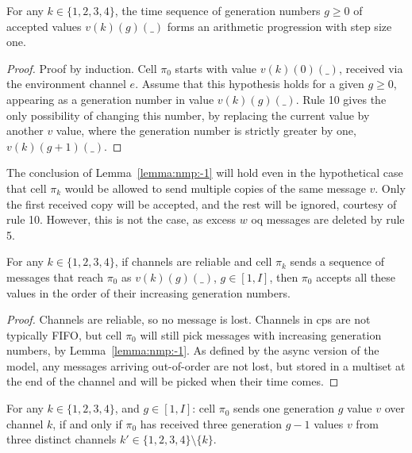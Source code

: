 \begin{lemma}\label{lemma:nmp:-1}
    For any $k \in \{ 1, 2, 3, 4 \}$, the time sequence of generation numbers $g \geq 0$ of accepted values $v(k)(g)(\_)$ forms an arithmetic progression with step size one.
\end{lemma}

\begin{proof}
    Proof by induction. Cell $\pi_0$ starts with value $v(k)(0)(\_)$, received via the environment channel $e$.
    Assume that this hypothesis holds for a given $g \geq 0$, appearing as a generation number in value $v(k)(g)(\_)$. Rule 10 gives the only possibility of changing this number, by replacing the current value by another $v$ value, where the generation number is strictly greater by one, 
    $v(k)(g+1)(\_)$. %
\end{proof}


\begin{remark}\label{remark:nmp:-1}
The conclusion of Lemma~\ref{lemma:nmp:-1} will hold even in the hypothetical case that cell $\pi_k$ would be allowed to send multiple copies of the same message $v$. 
Only the first received copy will be accepted, and the rest will be ignored,
courtesy of rule 10. However, this is not the case, as excess \(w\) \gls{oq} messages are deleted by rule 5. 
\end{remark}

\begin{lemma}\label{lemma:nmp:-2}
    For any $k \in \{ 1, 2, 3, 4 \}$, if channels are reliable and cell $\pi_k$ sends a sequence of messages that reach $\pi_0$ as $v(k)(g)(\_)$, $g \in [1,I]$, 
    then $\pi_0$ accepts all these values in the order of their increasing generation numbers.
\end{lemma}

\begin{proof}
    Channels are reliable, so no message is lost. Channels in \gls{cps} are not typically FIFO, but cell $\pi_0$ will still pick messages with increasing generation numbers, by Lemma~\ref{lemma:nmp:-1}.
    As defined by the async version of the model, any messages arriving out-of-order are not lost, but stored in a multiset at the end of the channel
    and will be picked when their time comes. %
\end{proof}

\begin{lemma}\label{lemma:nmp:-3}
    For any $k \in \{ 1, 2, 3, 4 \}$, and $g \in [1, I]$: cell $\pi_0$ sends one generation $g$ value $v$ over channel $k$, if and only if $\pi_0$ has received three generation $g-1$ values $v$ from three distinct channels $k' \in 
    \{ 1, 2, 3, 4 \} \setminus \{ k \}$.
\end{lemma}


